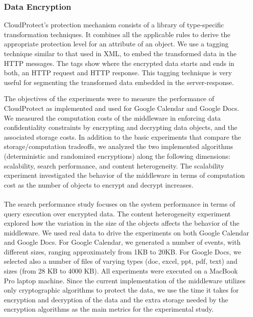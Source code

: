 \documentclass[11pt,onecolumn]{article}
\begin{document}
\subsubsection{Data Encryption}
CloudProtect’s protection mechanism consists of a library of type-specific transformation
techniques. It combines all the applicable rules to derive the appropriate
protection level for an attribute of an object. We use a tagging technique similar to
that used in XML, to embed the transformed data in the HTTP messages. The tags
show where the encrypted data starts and ends in both, an HTTP request and HTTP
response. This tagging technique is very useful for segmenting the transformed data
embedded in the server-response.



The objectives of the experiments were to measure the performance of CloudProtect
as implemented and used for Google Calendar and Google Docs. We measured the
computation costs of the middleware in enforcing data confidentiality constraints by
encrypting and decrypting data objects, and the associated storage costs. In addition
to the basic experiments that compare the storage/computation tradeoffs, we analyzed
the two implemented algorithms (deterministic and randomized encryptions)
along the following dimensions: scalability, search performance, and content heterogeneity.
The scalability experiment investigated the behavior of the middleware in
terms of computation cost as the number of objects to encrypt and decrypt increases.
\paragraph{}
The search performance study focuses on the system performance in terms of query
execution over encrypted data. The content heterogeneity experiment explored how
the variation in the size of the objects affects the behavior of the middleware.
We used real data to drive the experiments on both Google Calendar and Google Docs.
For Google Calendar, we generated a number of events, with different sizes, ranging
approximately from 1KB to 20KB. For Google Docs, we selected also a number of
files of varying types (doc, excel, ppt, pdf, text) and sizes (from 28 KB to 4000 KB).
All experiments were executed on a MacBook Pro laptop machine.
Since the current implementation of the middleware utilizes only cryptographic algorithms
to protect the data, we use the time it takes for encryption and decryption
of the data and the extra storage needed by the encryption algorithms as the main
metrics for the experimental study.
\end{document}
